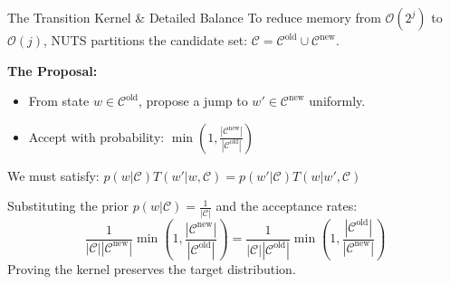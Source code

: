 \documentclass{beamer}
\begin{document}
\begin{frame}{The Transition Kernel \& Detailed Balance}
    To reduce memory from $\mathcal{O}(2^j)$ to $\mathcal{O}(j)$, NUTS partitions the candidate set: $\mathcal{C} = \mathcal{C}^{\text{old}} \cup \mathcal{C}^{\text{new}}$.

    \vspace{0.03cm}
    \textbf{The Proposal:}
    \begin{itemize}
        \item From state $w \in \mathcal{C}^{\text{old}}$, propose a jump to $w' \in \mathcal{C}^{\text{new}}$ uniformly.
        \item Accept with probability: $\min\left(1, \frac{|\mathcal{C}^{\text{new}}|}{|\mathcal{C}^{\text{old}}|}\right)$
    \end{itemize}

    \vspace{0.03cm}
    \begin{tcolorbox}[colback=CSlight, colframe=CSgrey, title=Proof of Detailed Balance (Intuition)]
        We must satisfy: $p(w|\mathcal{C})T(w'|w, \mathcal{C}) = p(w'|\mathcal{C})T(w|w', \mathcal{C})$
        
        \vspace{0.05cm}
        Substituting the prior $p(w|\mathcal{C}) = \frac{1}{|\mathcal{C}|}$ and the acceptance rates:
        $$ \frac{1}{|\mathcal{C}||\mathcal{C}^{\text{new}}|} \min\left(1, \frac{|\mathcal{C}^{\text{new}}|}{|\mathcal{C}^{\text{old}}|}\right) = \frac{1}{|\mathcal{C}||\mathcal{C}^{\text{old}}|} \min\left(1, \frac{|\mathcal{C}^{\text{old}}|}{|\mathcal{C}^{\text{new}}|}\right) $$
        Proving the kernel preserves the target distribution.
    \end{tcolorbox}
\end{frame}
\end{document}
